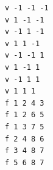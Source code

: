 \begin{verbatim}
v -1 -1 -1 
v 1 -1 -1 
v -1 1 -1 
v 1 1 -1 
v -1 -1 1 
v 1 -1 1 
v -1 1 1 
v 1 1 1 
f 1 2 4 3
f 1 2 6 5 
f 1 3 7 5 
f 2 4 8 6 
f 3 4 8 7 
f 5 6 8 7
\end{verbatim}
